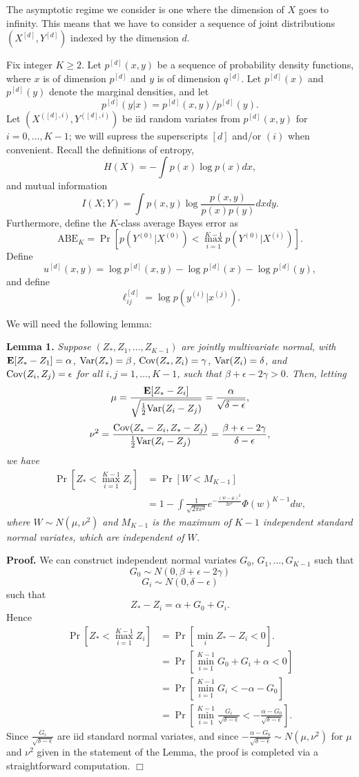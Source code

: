 \documentclass[12pt]{article}
\begin{document}
The asymptotic regime we consider is one where the dimension of $X$ goes to infinity.
This means that we have to consider a sequence of joint distributions $(X^{[d]}, Y^{[d]})$ indexed by the dimension $d$.

Fix integer $K \geq 2$.  Let $p^{[d]}(x,y)$ be a sequence of
probability density functions, where $x$ is of dimension $p^{[d]}$ and
$y$ is of dimension $q^{[d]}$.  Let $p^{[d]}(x)$ and $p^{[d]}(y)$
denote the marginal densities, and let
\[
p^{[d]}(y|x) = p^{[d]}(x, y)/p^{[d]}(y).\]
 Let $(X^{([d], i)}, Y^{([d], i)})$ be
iid random variates from $p^{[d]}(x, y)$ for $i = 0, \hdots, K-1$; we will supress the
superscripts $[d]$ and/or $(i)$ when convenient.  Recall the definitions of
entropy,
\[
H(X) = -\int p(x) \log p(x) dx,
\]
and mutual information
\[
I(X; Y) = \int p(x, y) \log \frac{p(x, y)}{p(x)p(y)} dx dy.
\]
Furthermore, define the $K$-class average Bayes error as
\[
\text{ABE}_K = \Pr[p(Y^{(0)}|X^{(0)}) < \max_{i = 1}^{K-1} p(Y^{(0)}|X^{(i)})].
\]
Define
\[
u^{[d]}(x, y) = \log p^{[d]}(x, y) - \log p^{[d]}(x) - \log p^{[d]}(y),
\]
and define
\[
\ell_{ij}^{[d]} = \log p(y^{(i)}|x^{(j)}).
\]

We will need the following lemma:

\textbf{Lemma 1. }
\emph{
Suppose $(Z_*, Z_1, \hdots, Z_{K-1})$ are jointly multivariate normal, with 
$\textbf{E}[Z_* - Z_1]= \alpha$, 
$\text{Var}(Z_*) = \beta$, 
$\text{Cov}(Z_*, Z_i) = \gamma$, 
$\text{Var}(Z_i)= \delta$, and $\text{Cov}(Z_i, Z_j) = \epsilon$ for all $i, j = 1, \hdots,
K-1$, such that $\beta + \epsilon - 2\gamma > 0$.  Then, letting
\[
\mu = \frac{\textbf{E}[Z_* - Z_i]}{\sqrt{\frac{1}{2}\text{Var}(Z_i - Z_j)}} = \frac{\alpha}{\sqrt{\delta - \epsilon}},
\]
\[
\nu^2 = \frac{\text{Cov}(Z_* -Z_i, Z_* - Z_j)}{\frac{1}{2}\text{Var}(Z_i - Z_j)} = \frac{\beta + \epsilon - 2\gamma}{\delta - \epsilon},
\]
we have
\begin{align*}
\Pr[Z_* < \max_{i=1}^{K-1} Z_i] &= \Pr[W < M_{K-1}]
\\&= 1 - \int \frac{1}{\sqrt{2\pi\nu^2}} e^{-\frac{(w-\mu)^2}{2\nu^2}} \Phi(w)^{K-1} dw,
\end{align*}
where $W \sim N(\mu, \nu^2)$ and $M_{K-1}$ is the maximum of $K-1$
independent standard normal variates, which are independent of $W$.
}

\textbf{Proof.}
We can construct independent normal variates $G_0$, $G_1,\hdots, G_{K-1}$
such that
\[
G_0 \sim N(0, \beta + \epsilon - 2 \gamma)
\]
\[
G_i \sim N(0, \delta - \epsilon)
\]
such that
\[
Z_* - Z_i = \alpha + G_0 + G_i.
\]
Hence
\begin{align*}
\Pr[Z_* < \max_{i=1}^{K-1} Z_i] &= \Pr[\min_i Z_* - Z_i < 0].
\\&= \Pr[\min_{i=1}^{K-1} G_0 + G_i + \alpha < 0]
\\&= \Pr[\min_{i=1}^{K-1} G_i < -\alpha - G_0]
\\&= \Pr[\min_{i=1}^{K-1} \frac{G_i}{\sqrt{\delta - \epsilon}} < -\frac{\alpha - G_0}{\sqrt{\delta - \epsilon}}].
\end{align*}
Since $\frac{G_i}{\sqrt{\delta - \epsilon}}$ are iid standard normal variates, and since
$-\frac{\alpha - G_0}{\sqrt{\delta - \epsilon}} \sim N(\mu,\nu^2)$ for $\mu$ and $\nu^2$ given in the statement of the Lemma, the proof is completed via a straightforward computation.  $\Box$
\end{document}
